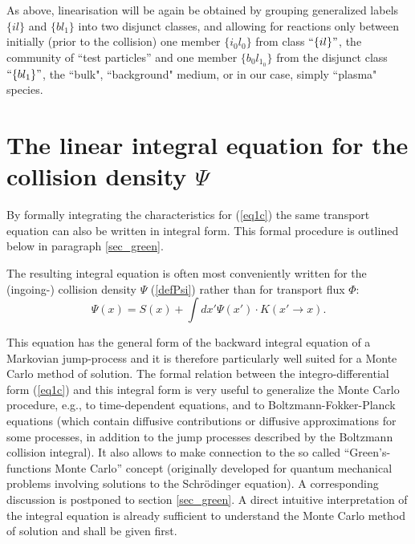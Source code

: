 As above, linearisation will be again be obtained by grouping generalized labels $\{il\}$ and $\{bl_1\}$ into two disjunct classes,
and allowing for reactions only between initially (prior to the collision) one member $\{i_0l_0\}$ from class $``\{il\}"$, the community of ``test particles''
and one member $\{b_0l_{1_0}\}$ from the disjunct class $``\{bl_1\}"$, the ``bulk", ``background" medium, or in our case, simply ``plasma" species.

\section{The linear integral equation for the collision density
$\Psi$} \label{sec1.1}

By formally integrating the characteristics for  (\ref{eq1c}) the
same transport equation can also be written in integral form. This formal procedure is outlined below in
paragraph \ref{sec_green}.

The resulting integral equation is often most conveniently written for the (ingoing-) collision density $\Psi$ (\ref{defPsi}) rather than for
transport flux $\Phi$:
\renewcommand{\theequation}{1.1d}
\begin{equation} \label{eq1d}
\Psi(x) = S(x) + \int dx ' \Psi (x ') \cdot K(x '\rightarrow x)  .
\end{equation}
\addtocounter{equation}{-1}
\renewcommand{\theequation}{\arabic{section}.\arabic{equation}}
This equation has the general form of the backward integral
equation of a Markovian jump-process and it is therefore
particularly well suited for a Monte Carlo method of solution. The
formal relation between the integro-differential form (\ref{eq1c})
and this integral form is very useful to generalize the Monte
Carlo procedure, e.g., to time-dependent equations, and to
Boltzmann-Fokker-Planck equations (which contain diffusive
contributions or diffusive approximations for some processes, in
addition to the jump processes described by the Boltzmann
collision integral). It also allows to make connection to the so
called ``Green's-functions Monte Carlo'' concept (originally
developed for quantum mechanical problems involving solutions to
the Schr\"odinger equation). A corresponding discussion is
postponed to section \ref{sec_green}. A direct intuitive
interpretation of the integral equation is already sufficient to
understand the Monte Carlo method of solution and shall be given
first.

